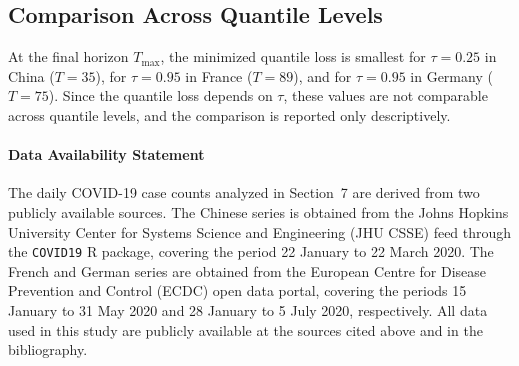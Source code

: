 \documentclass[12pt,a4paper]{article}
\begin{document}
{\color{blue}
\subsection{Comparison Across Quantile Levels}

At the final horizon $T_{\max}$, the minimized quantile loss is
smallest for $\tau=0.25$ in China ($T=35$), for $\tau=0.95$ in France
($T=89$), and for $\tau=0.95$ in Germany ($T=75$). Since the quantile
loss depends on $\tau$, these values are not comparable across
quantile levels, and the comparison is reported only descriptively.}

%



\paragraph*{Data Availability Statement}

The daily COVID-19 case counts analyzed in Section~7 are derived
from two publicly available sources. The Chinese series is obtained
from the Johns Hopkins University Center for Systems Science and
Engineering (JHU CSSE) feed through the \texttt{COVID19} R package,
covering the period 22 January to 22 March 2020. The French and
German series are obtained from the European Centre for Disease
Prevention and Control (ECDC) open data portal, covering the periods
15 January to 31 May 2020 and 28 January to 5 July 2020,
respectively. All data used in this study are publicly available at
the sources cited above and in the bibliography.
\end{document}
